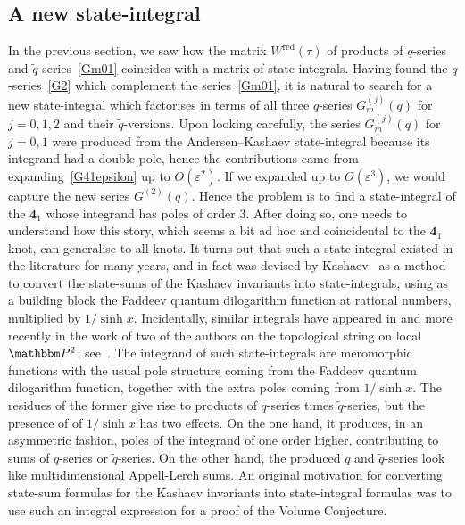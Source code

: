 \documentclass[12pt,reqno]{amsart}
\theoremstyle{definition}
\def\BP{\mathbbm P}
\def\tq{\tilde{q}}
\def\ve{\varepsilon}
\def\RED{\mathrm{red}}
\def\md{\mathbf}
\newcommand{\knot}[1]{\md{#1}}
\begin{document}
\subsection{A new state-integral}
\label{sub.AK41new}

In the previous section, we saw how the matrix $W^\RED(\tau)$ of
products of $q$-series and $\tq$-series~\eqref{Gm01} coincides with a
matrix of state-integrals.  Having found the $q$-series~\eqref{G2}
which complement the series~\eqref{Gm01}, it is natural to search for
a new state-integral which factorises in terms of all three $q$-series
$G_{m}^{(j)}(q)$ for $j=0,1,2$ and their $\tq$-versions.  Upon looking
carefully, the series $G_{m}^{(j)}(q)$ for $j=0,1$ were produced from
the Andersen--Kashaev state-integral because its integrand had a
double pole, hence the contributions came from
expanding~\eqref{G41epsilon} up to $O(\ve^2)$.  If we expanded up to
$O(\ve^3)$, we would capture the new series $G^{(2)}(q)$.  Hence the
problem is to find a state-integral of the $\knot{4}_1$ whose integrand has
poles of order $3$. After doing so, one needs to understand how this
story, which seems a bit ad hoc and coincidental to the $\knot{4}_1$ knot,
can generalise to all knots.  It turns out that such a state-integral
existed in the literature for many years, and in fact was devised by
Kashaev~\cite{kas-volume} as a method to convert the state-sums of the
Kashaev invariants into state-integrals, using as a building block the
Faddeev quantum dilogarithm function at rational numbers, multiplied
by $1/\sinh x$.  Incidentally, similar integrals have appeared in
\cite{kas-mar} and more recently in the work of two of the authors on
the topological string on local $\BP^2$;
see~\cite[Eqn.3.141]{GM:top-sting}. The integrand of such
state-integrals are meromorphic functions with the usual pole
structure coming from the Faddeev quantum dilogarithm function,
together with the extra poles coming from $1/\sinh x$. The residues of
the former give rise to products of $q$-series times $\tq$-series, but
the presence of of $1/\sinh x$ has two effects.  On the one hand, it
produces, in an asymmetric fashion, poles of the integrand of one
order higher, contributing to sums of $q$-series or $\tq$-series. On
the other hand, the produced $q$ and $\tq$-series look like
multidimensional Appell-Lerch sums.  An original motivation for
converting state-sum formulas for the Kashaev invariants into
state-integral formulas was to use such an integral expression for a
proof of the Volume Conjecture.
\end{document}
